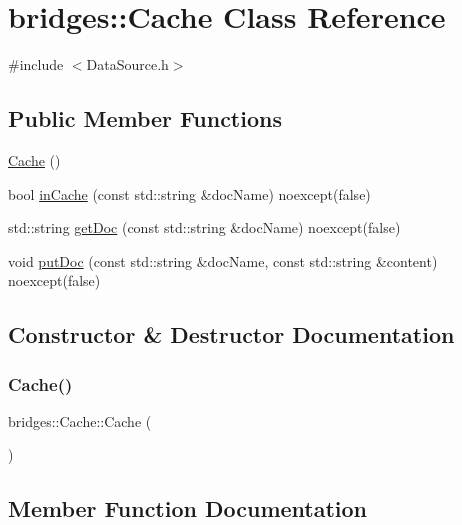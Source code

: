 \hypertarget{classbridges_1_1_cache}{}\section{bridges\+:\+:Cache Class Reference}
\label{classbridges_1_1_cache}


{\ttfamily \#include $<$Data\+Source.\+h$>$}

\subsection*{Public Member Functions}
\begin{DoxyCompactItemize}
\item 
\mbox{\hyperlink{classbridges_1_1_cache_a8928b7b0371256bece3254c6b5399eaa}{Cache}} ()
\item 
bool \mbox{\hyperlink{classbridges_1_1_cache_a47b9bd1b61a90f2844b4220337dd10fe}{in\+Cache}} (const std\+::string \&doc\+Name) noexcept(false)
\item 
std\+::string \mbox{\hyperlink{classbridges_1_1_cache_ade9849447cc907e4ee58b543f426bf76}{get\+Doc}} (const std\+::string \&doc\+Name) noexcept(false)
\item 
void \mbox{\hyperlink{classbridges_1_1_cache_ac289170b26980f80e6789f40561b5a95}{put\+Doc}} (const std\+::string \&doc\+Name, const std\+::string \&content) noexcept(false)
\end{DoxyCompactItemize}


\subsection{Constructor \& Destructor Documentation}
\mbox{\label{classbridges_1_1_cache_a8928b7b0371256bece3254c6b5399eaa}} 
\subsubsection{\texorpdfstring{Cache()}{Cache()}}
{\footnotesize\ttfamily bridges\+::\+Cache\+::\+Cache (\begin{DoxyParamCaption}{ }\end{DoxyParamCaption})\hspace{0.3cm}{\ttfamily [inline]}}



\subsection{Member Function Documentation}
\mbox{\label{classbridges_1_1_cache_ade9849447cc907e4ee58b543f426bf76}} 
